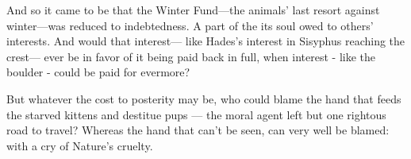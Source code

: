 

And so it came to be that the Winter Fund—the animals' last resort against winter—was reduced to indebtedness. A part of the its soul owed to others' interests. And would that interest— like Hades's interest in Sisyphus reaching the crest— ever be in favor of it being paid back in full, when interest - like the boulder - could be paid for evermore?

But whatever the cost to posterity may be, who could blame the hand that feeds the starved kittens and destitue pups — the moral agent left but one rightous road to travel? Whereas the hand that can't be seen, can very well be blamed: with a cry of Nature's cruelty. 









